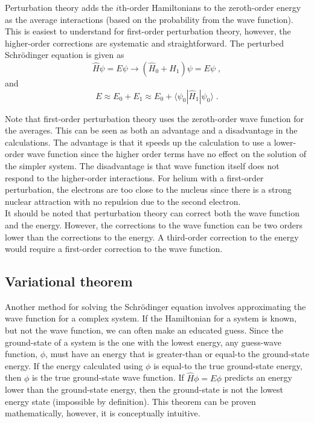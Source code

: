 \documentclass[12pt]{report}
\begin{document}
Perturbation theory adds the $i$th-order Hamiltonians to the zeroth-order
energy as the average interactions (based on the probability from the
wave function). This is easiest to understand for first-order perturbation
theory, however, the higher-order corrections are systematic and
straightforward. The perturbed Schr\"{o}dinger equation is given as
\begin{equation}
 \hat H\psi=E\psi \to (\hat H_0 + \hat H_1)\psi = E\psi \; , 
\end{equation}
and
\begin{equation}
 E \approx E_0 + E_1 \approx E_0 + \langle\psi_0|\hat H_1|\psi_0\rangle \; .
\end{equation}

Note that first-order perturbation theory uses the zeroth-order wave 
function for the averages. This can be seen as both an advantage and a
disadvantage in the calculations. The advantage is that it speeds up the
calculation to use a lower-order wave function since the higher order terms
have no effect on the solution of the simpler system. The disadvantage is that
wave function itself does not respond to the higher-order interactions. For
helium with a first-order perturbation, the electrons are too close to the
nucleus since there is a strong nuclear attraction with no repulsion due to
the second electron. \\

It should be noted that perturbation theory can correct both the wave function
and the energy. However, the corrections to the wave function can be two orders
lower than the corrections to the energy. A third-order correction to the
energy would require a first-order correction to the wave function.

\subsection{Variational theorem}

Another method for solving the Schr\"{o}dinger equation involves approximating
the wave function for a complex system. If the Hamiltonian for a system is
known, but not the wave function, we can often make an educated guess. Since
the ground-state of a system is the one with the lowest energy, any
guess-wave function, $\phi$, must have an energy that is greater-than or
equal-to the ground-state energy. If the energy calculated using $\phi$ is
equal-to the true ground-state energy, then $\phi$ is the true ground-state
wave function. If $\hat H\phi=E\phi$ predicts an energy lower than the
ground-state energy, then the ground-state is not the lowest energy state
(impossible by definition). This theorem can be proven mathematically,
however, it is conceptually intuitive. \\
\end{document}
